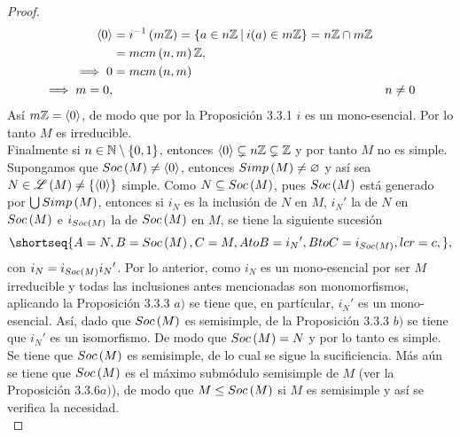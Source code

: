 \documentclass{article}
\newcommand{\socle}[1]{
	Soc\lrprth{#1}
}
\begin{document}
\begin{enumerate}[label=\textbf{Ej \arabic*.}]
\begin{proof}
\begin{align*}
			\gengroup{0}&=i^{-1}\lrprth{m\mathbb{Z}}=\lrbrack{a\in n\mathbb{Z}\ \vline\ i(a)\in m\mathbb{Z}}=n\mathbb{Z}\cap m\mathbb{Z}\\
			&=mcm\lrprth{n,m}\mathbb{Z},\\
			\implies 0&=mcm\lrprth{n,m}\\
			\implies m=0, && n\neq 0
		\end{align*}
		Así $m\mathbb{Z}=\left< 0\right>$, de modo que por la Proposición 3.3.1 $i$ es un mono-esencial. Por lo tanto $M$ es irreducible.\\
		Finalmente si $n\in\mathbb{N}\setminus\left\{0,1\right\}$, entonces $\left< 0\right>\subsetneq n\mathbb{Z}\subsetneq \mathbb{Z}$ y por tanto $M$ no es simple.\\
		
		 Supongamos que $Soc\left(M\right)\neq\left< 0\right>$, entonces $Simp\left(M\right)\neq\varnothing$ y así sea $N\in\mathscr{L}\left(M\right)\neq\left\{\left< 0\right>\right\}$ simple. Como  $N\subseteq Soc\left(M\right)$, pues $Soc\left(M\right)$ está generado por $\bigcup Simp\left(M\right)$, entonces si $i_N$ es la inclusión de $N$ en $M$, ${i_N}'$ la de $N$ en $Soc\left(M\right)$ e $i_{\socle{M}}$ la de $Soc\left(M\right)$ en $M$, se tiene la siguiente sucesión
		\begin{equation*}
			\shortseq{A=N, B=\socle{M},C=M, AtoB={i_N}', BtoC=i_{\socle{M}},lcr=c,},
		\end{equation*} con $i_N=i_{\socle{M}}{i_N}'$. Por lo anterior, como $i_N$ es un mono-esencial por ser $M$ irreducible y todas las inclusiones antes mencionadas son monomorfismos, aplicando la Proposición 3.3.3 $a)$ se tiene que, en partícular, ${i_N}'$ es un mono-esencial. Así, dado que $\socle{M}$ es semisimple, de la Proposición 3.3.3 $b)$ se tiene que ${i_N}'$ es un isomorfismo. De modo que $\socle{M}=N$ y por lo tanto es simple.\\
		
		 Se tiene que $\socle{M}$ es semisimple, de lo cual se sigue la sucificiencia. Más aún se tiene que $\socle{M}$ es el máximo submódulo semisimple de $M$ (ver la Proposición 3.3.6$a)$), de modo que $M\leq \socle{M}$ si $M$ es semisimple y así se verifica la necesidad. \\
		

\end{proof}
\end{enumerate}
\end{document}
